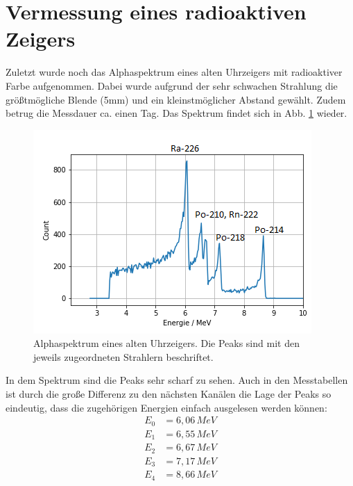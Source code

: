 \section{Vermessung eines radioaktiven Zeigers}

Zuletzt wurde noch das Alphaspektrum eines alten Uhrzeigers mit radioaktiver Farbe aufgenommen. Dabei wurde aufgrund der sehr schwachen 
Strahlung die größtmögliche Blende (5mm) und ein kleinstmöglicher Abstand gewählt. Zudem betrug die Messdauer ca. einen Tag. Das 
Spektrum findet sich in Abb. \ref{bild:uhr} wieder. \\

\begin{figure}[h]
    \centering
    \includegraphics[scale=0.75]{Bilder/uhr.png}
    \caption{Alphaspektrum eines alten Uhrzeigers. Die Peaks sind mit den jeweils zugeordneten Strahlern beschriftet.}
    \label{bild:uhr}
\end{figure}

In dem Spektrum sind die Peaks sehr scharf zu sehen. Auch in den Messtabellen ist durch die große Differenz zu den nächsten Kanälen die Lage der Peaks so eindeutig, 
dass die zugehörigen Energien einfach ausgelesen werden können: \\

\begin{align*}
    E_0 &= 6,06 \, MeV \\
    E_1 &= 6,55 \, MeV \\
    E_2 &= 6,67 \, MeV \\
    E_3 &= 7,17 \, MeV \\
    E_4 &= 8,66 \, MeV \\
\end{align*}

